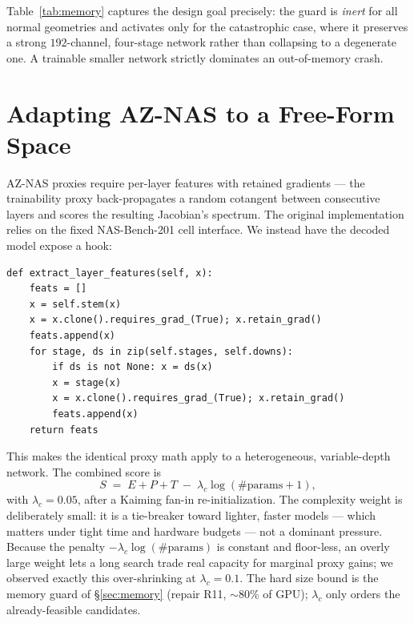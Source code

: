\documentclass[10pt,twocolumn]{article}
\begin{document}
Table~\ref{tab:memory} captures the design goal precisely: the guard is
\emph{inert} for all normal geometries and activates only for the catastrophic
case, where it preserves a strong $192$-channel, four-stage network rather than
collapsing to a degenerate one. A trainable smaller network strictly dominates
an out-of-memory crash.

\section{Adapting AZ-NAS to a Free-Form Space}
\label{sec:proxy-adapt}

AZ-NAS proxies require per-layer features with retained gradients --- the
trainability proxy back-propagates a random cotangent between consecutive
layers and scores the resulting Jacobian's spectrum. The original
implementation relies on the fixed NAS-Bench-201 cell interface. We instead
have the decoded model expose a hook:

\begin{lstlisting}
def extract_layer_features(self, x):
    feats = []
    x = self.stem(x)
    x = x.clone().requires_grad_(True); x.retain_grad()
    feats.append(x)
    for stage, ds in zip(self.stages, self.downs):
        if ds is not None: x = ds(x)
        x = stage(x)
        x = x.clone().requires_grad_(True); x.retain_grad()
        feats.append(x)
    return feats
\end{lstlisting}

This makes the identical proxy math apply to a heterogeneous, variable-depth
network. The combined score is
\begin{equation}
S \;=\; E + P + T \;-\; \lambda_c \log(\#\text{params}+1),
\end{equation}
with $\lambda_c=0.05$, after a Kaiming fan-in re-initialization. The
complexity weight is deliberately small: it is a tie-breaker toward lighter,
faster models --- which matters under tight time and hardware budgets --- not a
dominant pressure. Because the penalty $-\lambda_c\log(\#\text{params})$ is
constant and floor-less, an overly large weight lets a long search trade real
capacity for marginal proxy gains; we observed exactly this over-shrinking at
$\lambda_c=0.1$. The hard size bound is the memory guard of
\S\ref{sec:memory} (repair R11, $\sim$80\% of GPU); $\lambda_c$ only orders the
already-feasible candidates.
\end{document}
